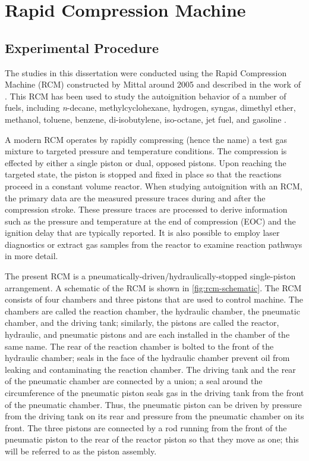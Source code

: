 \documentclass[12pt, letterpaper]{article}
\begin{document}
\section{Rapid Compression Machine}
\label{sec:rcm}
\subsection{Experimental Procedure}
The studies in this dissertation were conducted using the Rapid
Compression Machine (RCM) constructed by Mittal around 2005 and described in the
work of \textcite{Mittal2007,Mittal2006a}. This RCM has been used to
study the autoignition behavior of a number of fuels, including
\textit{n}-decane, methylcyclohexane, hydrogen, syngas,
dimethyl ether, methanol, toluene, benzene, di-isobutylene, iso-octane,
jet fuel, and gasoline \cite{Kumar2009, Mittal2009, Das2012a, Mittal2006,
Das2012, Mittal2008a, Kumar2011a, Mittal2007a, Mittal2008, Kumar2010,
Dooley2010, Dooley2012, Hui2012a, Keromnes2013, Kukkadapu2013, Kukkadapu2012a}.

A modern RCM operates by rapidly compressing (hence the name) a test gas
mixture to targeted pressure and temperature conditions. The compression
is effected by either a single piston or dual, opposed pistons. Upon reaching
the targeted state, the piston is stopped and fixed in place so that the reactions
proceed in a constant volume reactor. When studying autoignition with an RCM,
the primary data are the measured pressure traces during and after the
compression stroke. These pressure traces are processed to derive
information such as the pressure and temperature at the end of
compression (EOC) and the ignition delay that are typically reported.
It is also possible to employ laser diagnostics or extract gas samples
from the reactor to examine reaction pathways in more detail.

The present RCM is a pneumatically-driven/hydraulically-stopped
single-piston arrangement. A schematic of the RCM is shown in
\autoref{fig:rcm-schematic}. The RCM consists of four chambers and
three pistons that are used to control machine. The chambers are
called the reaction chamber, the hydraulic chamber, the pneumatic
chamber, and the driving tank; similarly, the pistons are called
the reactor, hydraulic, and pneumatic pistons and are each installed
in the chamber of the same name. The rear of the reaction chamber
is bolted to the front of the hydraulic chamber; seals in the face
of the hydraulic chamber prevent oil from leaking and contaminating
the reaction chamber. The driving tank and the rear of the pneumatic
chamber are connected by a union; a seal around the circumference of
the pneumatic piston seals gas in the driving tank from the front of
the pneumatic chamber. Thus, the pneumatic piston can be driven by
pressure from the driving tank on its rear and pressure from the
pneumatic chamber on its front. The three pistons are connected by
a rod running from the front of the pneumatic piston to the rear of
the reactor piston so that they move as one; this will be referred
to as the piston assembly.
\end{document}
